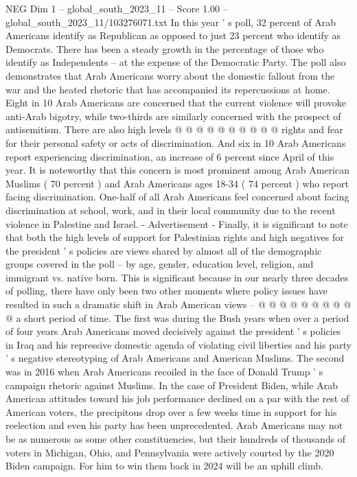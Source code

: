 \begin{textsample}{NEG Dim 1 – global\_south\_2023\_11 – Score 1.00 – global\_south\_2023\_11/103276071.txt}
In this year ' s poll, 32 percent of Arab Americans identify as Republican as opposed to just 23 percent who identify as Democrats.
There has been a steady growth in the percentage of those who identify as Independents -- at the expense of the Democratic Party.
The poll also demonstrates that Arab Americans worry about the domestic fallout from the war and the heated rhetoric that has accompanied its repercussions at home.
Eight in 10 Arab Americans are concerned that the current violence will provoke anti-Arab bigotry, while two-thirds are similarly concerned with the prospect of antisemitism.
There are also high levels @ @ @ @ @ @ @ @ @ @ rights and fear for their personal safety or acts of discrimination.
And six in 10 Arab Americans report experiencing discrimination, an increase of 6 percent since April of this year.
It is noteworthy that this concern is most prominent among Arab American Muslims ( 70 percent ) and Arab Americans ages 18-34 ( 74 percent ) who report facing discrimination.
One-half of all Arab Americans feel concerned about facing discrimination at school, work, and in their local community due to the recent violence in Palestine and Israel. - Advertisement - Finally, it is significant to note that both the high levels of support for Palestinian rights and high negatives for the president ' s policies are views shared by almost all of the demographic groups covered in the poll -- by age, gender, education level, religion, and immigrant vs. native born.
This is significant because in our nearly three decades of polling, there have only been two other moments where policy issues have resulted in such a dramatic shift in Arab American views -- @ @ @ @ @ @ @ @ @ @ a short period of time.
The first was during the Bush years when over a period of four years Arab Americans moved decisively against the president ' s policies in Iraq and his repressive domestic agenda of violating civil liberties and his party ' s negative stereotyping of Arab Americans and American Muslims.
The second was in 2016 when Arab Americans recoiled in the face of Donald Trump ' s campaign rhetoric against Muslims.
In the case of President Biden, while Arab American attitudes toward his job performance declined on a par with the rest of American voters, the precipitous drop over a few weeks time in support for his reelection and even his party has been unprecedented.
Arab Americans may not be as numerous as some other constituencies, but their hundreds of thousands of voters in Michigan, Ohio, and Pennsylvania were actively courted by the 2020 Biden campaign.
For him to win them back in 2024 will be an uphill climb.

\end{textsample}
